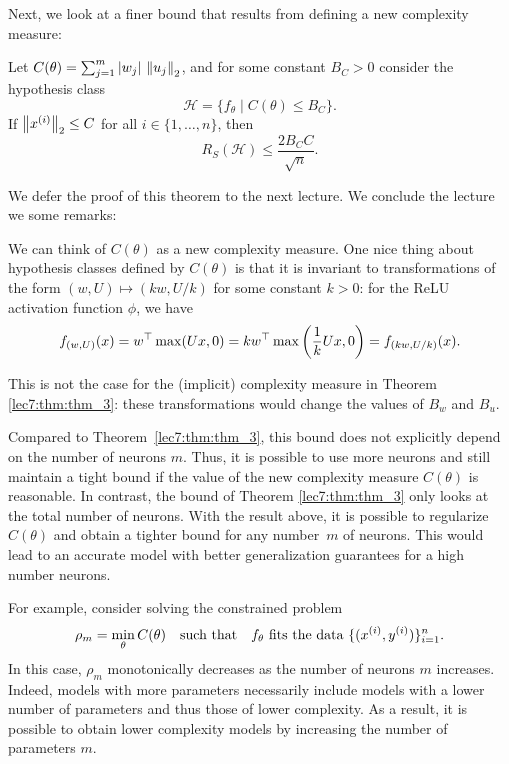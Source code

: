 Next, we look at a finer bound that results from defining a new complexity measure:

\begin{theorem}
    Let $C(\theta) = \sum_{j=1}^m |w_j|\,\Norm{u_j}_2$, and for some constant $B_C > 0$ consider the hypothesis class
    \begin{equation}
        \mathcal{H}=\{f_\theta \mid C(\theta) \leq B_C\}.
    \end{equation}
    If $\Norm{x\sp{i}}_2\leq C$ for all $i\in\{1,\dots,n\}$, then
    \begin{equation}
        R_S(\mathcal{H}) \leq \frac{2B_C C}{\sqrt{n}}.
    \end{equation}
\end{theorem}
We defer the proof of this theorem to the next lecture. We conclude the lecture we some remarks:

\begin{remark}
We can think of $C(\theta)$ as a new complexity measure. One nice thing about hypothesis classes defined by $C(\theta)$ is that it is invariant to transformations of the form $(w, U) \mapsto (kw, U /k)$ for some constant $k > 0$: for the ReLU activation function $\phi$, we have
\begin{equation}
    f_{(w, U)}(x) 
    = w^\top \max(Ux, 0) 
    = kw^\top \max\rbr{\frac{1}{k}Ux, 0}
    = f_{(kw, U/k)}(x).
\end{equation}

This is not the case for the (implicit) complexity measure in Theorem \ref{lec7:thm:thm_3}: these transformations would change the values of $B_w$ and $B_u$.
\end{remark}

\begin{remark}
Compared to Theorem~\ref{lec7:thm:thm_3}, this bound does not explicitly depend on the number of neurons $m$. Thus, it is possible to use more neurons and still maintain a tight bound if the value of the new complexity measure $C(\theta)$ is reasonable. In contrast, the bound of Theorem \ref{lec7:thm:thm_3} only looks at the total number of neurons. With the result above, it is possible to regularize $C(\theta)$ and obtain a tighter bound for any number~$m$ of neurons. This would lead to an accurate model with better generalization guarantees for a high number neurons. 

For example, consider solving the constrained problem
\begin{equation}
    \rho_m = \min_\theta C(\theta) 
    \quad \text{such that}\quad 
    \text{$f_\theta$ fits the data  $\{(x\sp{i}, y\sp{i})\}_{i=1}^n$.}
\end{equation}
In this case, $\rho_m$ monotonically decreases as the number of neurons $m$ increases. Indeed, models with more parameters necessarily include models with a lower number of parameters and thus those of lower complexity.  As a result, it is possible to obtain lower complexity models by increasing the number of parameters $m$.
\end{remark}
